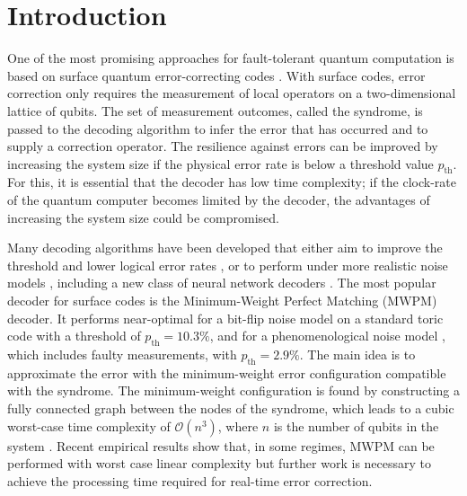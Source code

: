 \section{Introduction}\label{sec:introduction}
One of the most promising approaches for fault-tolerant quantum computation is based on surface quantum error-correcting codes \cite{dennis2002topological, kitaev2003fault}. With surface codes, error correction only requires the measurement of local operators on a two-dimensional lattice of qubits. The set of measurement outcomes, called the syndrome, is passed to the decoding algorithm to infer the error that has occurred and to supply a correction operator. The resilience against errors can be improved by increasing the system size if the physical error rate is below a threshold value $p_{\text{th}}$. For this, it is essential that the decoder has low time complexity; if the clock-rate of the quantum computer becomes limited by the decoder, the advantages of increasing the system size could be compromised.

Many decoding algorithms have been developed that either aim to improve the threshold and lower logical error rates \cite{wang2003confinement, raussendorf2007faulttolerant, fowler2012towards, fowler2013minimum, heim2016optimal, duclos2010fast, duclos2013fault, bravyi2014efficient, darmawan2018linear}, or to perform under more realistic noise models \cite{tuckett2020fault, hutter2015improved, bravyi2013quantum,  nickerson2019analysing, wootton2012high, huang2020fault}, including a new class of neural network decoders \cite{baireuther2019neural, chamberland2018deep, liu2019neural, nautrup2019optimizing, torlai2017neural, varsamopoulos2017decoding, varsamopoulos2020decoding}. %
The most popular decoder for surface codes is the Minimum-Weight Perfect Matching (MWPM) decoder. It performs near-optimal for a bit-flip noise model \cite{dennis2002topological} on a standard toric code with a threshold of $p_{\text{th}} = 10.3\%$, and for a phenomenological noise model \cite{wang2003confinement}, which includes faulty measurements, with $p_{\text{th}} = 2.9\%$. The main idea is to approximate the error with the minimum-weight error configuration compatible with the syndrome. The minimum-weight configuration is found by constructing a fully connected graph between the nodes of the syndrome, which leads to a cubic worst-case time complexity of $\mathcal{O}(n^3)$, where $n$ is the number of qubits in the system \cite{kolmogorov2009blossom}. Recent empirical results show that, in some regimes, MWPM can be performed with worst case linear complexity \cite{fowler2012towards} but further work is necessary to achieve the processing time required for real-time error correction.


